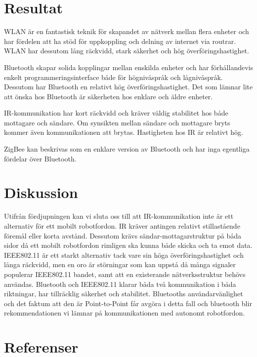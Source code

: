 \documentclass[a4paper,12pt,fleqn]{article}
\begin{document}
\newpage

\section{Resultat}
WLAN är en fantastisk teknik för skapandet av nätverk mellan flera enheter och har fördelen att ha stöd för uppkoppling och delning av internet via routrar. WLAN har dessutom lång räckvidd, stark säkerhet och hög överföringshastighet.
  
Bluetooth skapar solida kopplingar mellan enskilda enheter och har förhållandevis enkelt programmeringsinterface både för högnivåspråk och lågnivåspråk. Dessutom har Bluetooth en relativt hög överföringshastighet. Det som lämnar lite att önska hos Bluetooth är säkerheten hos enklare och äldre enheter.

IR-kommunikation har kort räckvidd och kräver väldig stabilitet hos både mottagare och sändare. Om synsikten mellan sändare och mottagare bryts kommer även kommunikationen att brytas. Hastigheten hos IR är relativt hög. 

ZigBee kan beskrivas som en enklare version av Bluetooth och har inga egentliga fördelar över Bluetooth. 

\section{Diskussion}
Utifrån fördjupningen kan vi sluta oss till att IR-kommunikation inte är ett alternativ för ett mobilt robotfordon. IR kräver antingen relativt stillastående föremål eller korta avstånd. Dessutom krävs sändar-mottagarstruktur på båda sidor då ett mobilt robotfordon rimligen ska kunna både skicka och ta emot data.
IEEE802.11 är ett starkt alternativ tack vare sin höga överföringshastighet och långa räckvidd, men en oro är störningar som kan uppstå då många signaler populerar IEEE802.11 bandet, samt att en existerande nätverksstruktur behövs användas.
Bluetooth och IEEE802.11 klarar båda två kommunikation i båda riktningar, har tillräcklig säkerhet och stabilitet. Bluetooths användarvänlighet och det faktum att den är Point-to-Point får avgöra i detta fall och bluetooth blir rekommendationen vi lämnar på kommunikationen med autonomt robotfordon.

\newpage 
\section*{Referenser}
\end{document}
